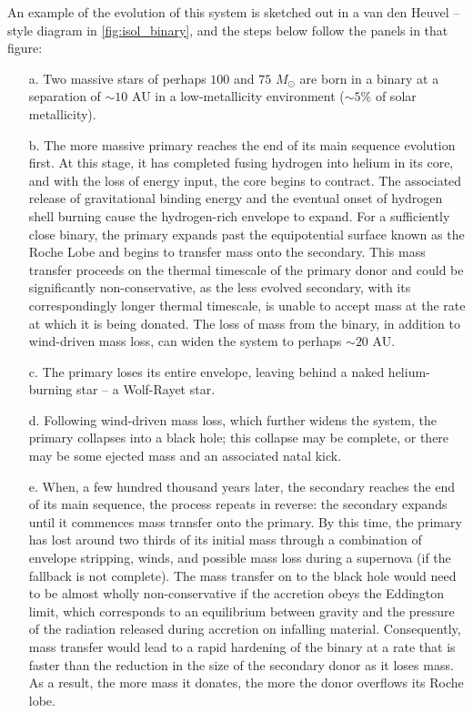 \documentclass[review]{elsarticle}
\begin{document}
An example of the evolution of this system is sketched out in a van den Heuvel -- style diagram in \autoref{fig:isol_binary}, and the steps below follow the panels in that figure:
\begin{enumerate}  
\item[a.] Two massive stars of perhaps $100$ and $75$ $M_{\odot}$ are born in a binary at a separation of $\sim 10$ AU in a low-metallicity environment ($\sim 5\%$ of solar metallicity).  
\item[b.] The more massive primary reaches the end of its main sequence evolution first.  At this stage, it has completed fusing hydrogen into helium in its core, and with the loss of energy input, the core begins to contract.  The associated release of gravitational binding energy and the eventual onset of hydrogen shell burning cause the hydrogen-rich envelope to expand.  For a sufficiently close binary, the primary expands past the equipotential surface known as the Roche Lobe and begins to transfer mass onto the secondary.  This mass transfer proceeds on the thermal timescale of the primary donor and could be significantly non-conservative, as the less evolved secondary, with its correspondingly longer thermal timescale, is unable to accept mass at the rate at which it is being donated.  The loss of mass from the binary, in addition to wind-driven mass loss, can widen the system to perhaps $\sim 20$ AU.  
\item[c.] The primary loses its entire envelope, leaving behind a naked helium-burning star -- a Wolf-Rayet star.  
\item[d.] Following wind-driven mass loss, which further widens the system, the primary collapses into a black hole; this collapse may be complete, or there may be some ejected mass and an associated natal kick.  
\item[e.] When, a few hundred thousand years later, the secondary reaches the end of its main sequence, the process repeats in reverse: the secondary expands until it commences mass transfer onto the primary.  By this time, the primary has lost around two thirds of its initial mass through a combination of envelope stripping, winds, and possible mass loss during a supernova (if the fallback is not complete).  The mass transfer on to the black hole would need to be almost wholly non-conservative if the accretion obeys the Eddington limit, which corresponds to an equilibrium between gravity and the pressure of the radiation released during accretion on infalling material.  Consequently, mass transfer would lead to a rapid hardening of the binary at a rate that is faster than the reduction in the size of the secondary donor as it loses mass.  As a result, the more mass it donates, the more the donor overflows its Roche lobe.  

\end{enumerate}
\end{document}
